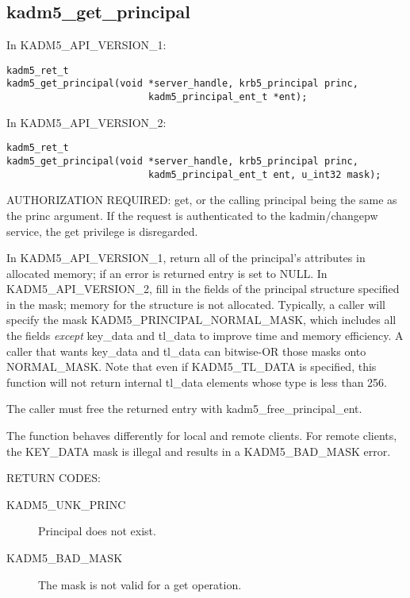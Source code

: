 \subsection{kadm5_get_principal}

In KADM5_API_VERSION_1:

\begin{verbatim}
kadm5_ret_t
kadm5_get_principal(void *server_handle, krb5_principal princ, 
                         kadm5_principal_ent_t *ent);  
\end{verbatim}

In KADM5_API_VERSION_2:

\begin{verbatim}
kadm5_ret_t
kadm5_get_principal(void *server_handle, krb5_principal princ, 
                         kadm5_principal_ent_t ent, u_int32 mask);  
\end{verbatim}

AUTHORIZATION REQUIRED: get, or the calling principal being the same
as the princ argument.  If the request is authenticated to the
kadmin/changepw service, the get privilege is disregarded.

In KADM5_API_VERSION_1, return all of the principal's attributes in
allocated memory; if an error is returned entry is set to NULL.  In
KADM5_API_VERSION_2, fill in the fields of the principal structure
specified in the mask; memory for the structure is not allocated.
Typically, a caller will specify the mask KADM5_PRINCIPAL_NORMAL_MASK,
which includes all the fields {\it except} key_data and tl_data to
improve time and memory efficiency.  A caller that wants key_data and
tl_data can bitwise-OR those masks onto NORMAL_MASK.  Note that even
if KADM5_TL_DATA is specified, this function will not return internal
tl_data elements whose type is less than 256.

The caller must free the returned entry with kadm5_free_principal_ent.

The function behaves differently for local and remote clients.  For
remote clients, the KEY_DATA mask is illegal and results in a
KADM5_BAD_MASK error.

RETURN CODES:

\begin{description}
\item[KADM5_UNK_PRINC] Principal does not exist.
\item[KADM5_BAD_MASK] The mask is not valid for a get operation.

\end{description}

